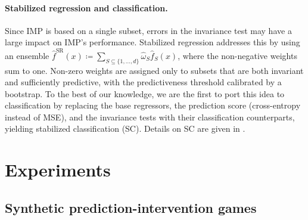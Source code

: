 \paragraph{Stabilized regression and classification.}
Since IMP is based
on a single subset, 
errors in the invariance test may have a large impact on IMP's performance.
Stabilized regression \citep{pfisterStabilizingVariableSelection2021} addresses this by using an ensemble
$\hat{f}^{\mathrm{SR}}(x) \coloneq \sum_{S \subseteq \{1, \ldots, d\}} \hat{\omega}_S \hat{f}_S(x)$, 
where the 
non-negative weights sum to one.
Non-zero weights are assigned only to subsets that are both invariant and sufficiently predictive, with the predictiveness threshold calibrated by a bootstrap. To the best of our knowledge, we are the first to port this idea to classification by replacing the base regressors, the prediction score (cross-entropy instead of MSE), and the invariance tests with their classification counterparts, yielding stabilized classification (SC). Details on SC are given in .



\section{Experiments} \label{sec:experiments}
\subsection{Synthetic prediction-intervention games}
\label{sec:synthetic_experiments}


